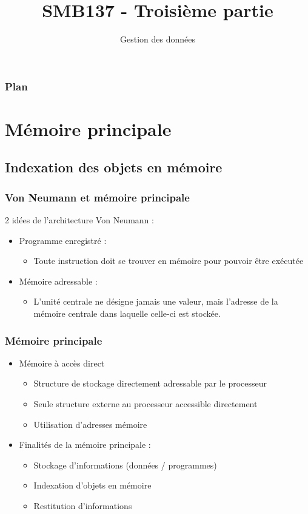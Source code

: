 

\title{SMB137 - Troisième partie}
\subtitle{Gestion des données}


\frame[plain]{\titlepage}


\begin{frame}
 \frametitle{Plan}
 \tableofcontents
\end{frame} 

\section{Mémoire principale}

\subsection{Indexation des objets en mémoire}

\begin{frame}
 \frametitle{Von Neumann et mémoire principale}
2 idées de l’architecture Von Neumann :
\begin{itemize}
	\item Programme enregistré : 
	\begin{itemize}
	\item Toute instruction doit se trouver en mémoire pour pouvoir être exécutée
	\end{itemize}
	\item Mémoire adressable :
	\begin{itemize}
	\item L’unité centrale ne désigne jamais une valeur, mais l’adresse de la mémoire centrale dans laquelle celle-ci est stockée.
	\end{itemize}
\end{itemize}
 \end{frame}

\begin{frame}
\frametitle{Mémoire principale}
\begin{itemize}
\item <1> Mémoire à accès direct
\begin{itemize}
\item Structure de stockage directement adressable par le processeur
\item Seule structure externe au processeur accessible directement
\item Utilisation d'adresses mémoire
\end{itemize}

\item <2> Finalités de la mémoire principale :
\begin{itemize}
	\item Stockage d'informations (données / programmes)
	\item Indexation d'objets en mémoire
	\item Restitution d'informations
\end{itemize}

\end{itemize}
\end{frame}


